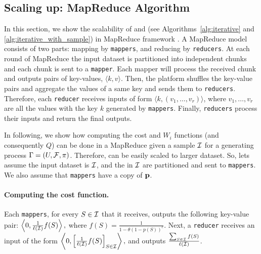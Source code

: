 \subsection{Scaling up: MapReduce Algorithm}\label{sec:mapreduce}
In this section, we show the scalability of {\optimizer} and {\appoptimizer} (see Algorithms~\ref{alg:iterative} and \ref{alg:iterative_with_sample}) in MapReduce framework \cite{dean2008mapreduce}. A MapReduce model consists of two parts: mapping by \texttt{mappers}, and reducing by \texttt{reducers}. At each round of MapReduce the input dataset is partitioned into independent chunks and each chunk is sent to a \texttt{mapper}. Each mapper will process the received chunk and outputs pairs of key-values, $\langle k, v \rangle$. Then, the  platform shuffles the key-value pairs and aggregate the values of a same key and sends them to \texttt{reducers}. Therefore, each \texttt{reducer} receives inputs of form $\langle k, (v_1, \ldots, v_r) \rangle$, where $v_1, \ldots, v_r$ are all the values with the key $k$ generated by \texttt{mappers}. Finally, \texttt{reducers} process their inputs and return the final outputs.

In following, we show how computing the cost and $W_i$ functions (and consequently $Q$)  can be done in a MapReduce given a sample $\mathcal{I}$ for a generating process $\Gamma=(U,\mathcal{F},\pi)$. Therefore, {\appoptimizer} can be easily scaled to larger dataset.
So, lets assume the input dataset is $\mathcal{I}$, and the {\ins} in $\mathcal{I}$ are partitioned and sent to \texttt{mappers}. We also assume that \texttt{mappers} have a copy of $\mathbf{p}$.


\paragraph{\bf Computing the cost function.}
Each \texttt{mappers}, for every $S\in \mathcal{I}$ that it receives, outputs the following key-value pair:
$\left\langle 0,  \frac{1}{\ell(\mathcal{I})}f(S) \right\rangle,$
where $f(S) = \frac{1}{1- \theta(1-p(S))^c}$.
Next, a \texttt{reducer} receives an input of the form
$\left\langle 0,  \left[\frac{1}{\ell(\mathcal{I})}f(S)\right]_{S\in \mathcal{I}}  \right\rangle,$
and outputs $\frac{\sum_{S\in \mathcal{I}}f(S)}{\ell(\mathcal{I})}$.

